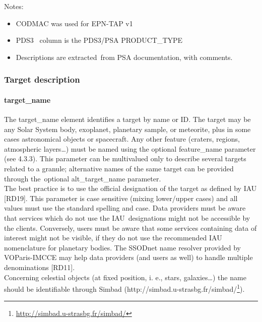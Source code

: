 \documentclass[11pt,a4paper]{ivoa}
\begin{document}
Notes:

\begin{itemize}
\item CODMAC was used for EPN-TAP v1
\item PDS3  column is the PDS3/PSA PRODUCT\_TYPE 
\item Descriptions are extracted from PSA documentation, with comments.
\end{itemize}

\subsubsection{Target description}

\paragraph{target\_name}

The target\_name element identifies a target by name or ID. The target may be any Solar System body, exoplanet, planetary sample, or meteorite, plus in some cases astronomical objects or spacecraft. Any other feature (craters, regions, atmospheric layers…) must be named using the optional feature\_name parameter (see 4.3.3). This parameter can be multivalued only to describe several targets related to a granule; alternative names of the same target can be provided through the optional alt\_target\_name parameter.\\ The best practice is to use the official designation of the target as defined by IAU [RD19]. This parameter is case sensitive (mixing lower/upper cases) and all values must use the standard spelling and case. Data providers must be aware that services which do not use the IAU designations might not be accessible by the clients. Conversely, users must be aware that some services containing data of interest might not be visible, if they do not use the recommended IAU nomenclature for planetary bodies. The SSODnet name resolver provided by VOParis-IMCCE may help data providers (and users as well) to handle multiple denominations [RD11].\\Concerning celestial objects (at fixed position, i. e., stars, galaxies…) the name should be identifiable through Simbad (http://simbad.u-strasbg.fr/simbad/\footnote{\url{http://simbad.u-strasbg.fr/simbad/}}).
\end{document}
